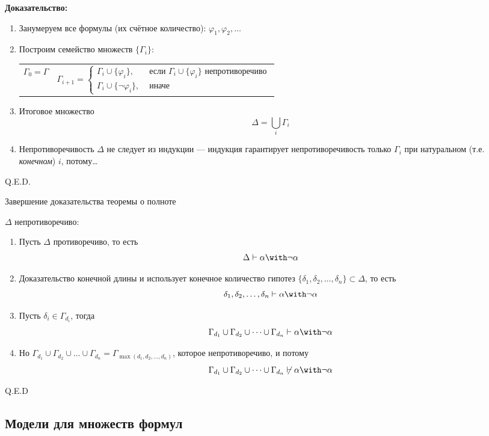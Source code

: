 \textbf{Доказательство:}
\begin{enumerate}
\item Занумеруем все формулы (их счётное количество): $\varphi_1, \varphi_2, \dots$
\item Построим семейство множеств $\{\Gamma_i\}$:

\begin{tabular}{cc}
$\Gamma_0 = \Gamma$  &
$\Gamma_{i+1} = \left\{\begin{array}{ll}\Gamma_i \cup \{\varphi_i\},& \mbox{ если } \Gamma_i \cup \{\varphi_i\} \mbox{ непротиворечиво}\\
                                               \Gamma_i \cup \{\neg\varphi_i\},& \mbox{ иначе}\end{array}\right.$
\end{tabular}
\item Итоговое множество $$\Delta = \bigcup_i \Gamma_i$$
\item Непротиворечивость $\Delta$ не следует из индукции --- индукция гарантирует непротиворечивость
      только $\Gamma_i$ при натуральном (т.е. \emph{конечном}) $i$, потому\dots
\end{enumerate}

\hfill Q.E.D.

{Завершение доказательства теоремы о полноте}



$\Delta$ непротиворечиво:
  \begin{enumerate}
    \item Пусть $\Delta$ противоречиво, то есть $$\Delta \vdash \alpha\with\neg\alpha$$
    \item Доказательство конечной длины и использует конечное количество гипотез $\{\delta_1, \delta_2, \dots, \delta_n\} \subset \Delta$,
          то есть $$\delta_1, \delta_2, \dots, \delta_n \vdash \alpha\with\neg\alpha$$
    \item Пусть $\delta_i \in \Gamma_{d_i}$, тогда $$\Gamma_{d_1}\cup \Gamma_{d_2}\cup \dots\cup \Gamma_{d_n} \vdash \alpha\with\neg\alpha$$
    \item Но $\Gamma_{d_1} \cup \Gamma_{d_2} \cup \dots \cup \Gamma_{d_n} = \Gamma_{\max(d_1,d_2,\dots,d_n)}$,
          которое непротиворечиво, и потому $$\Gamma_{d_1}\cup \Gamma_{d_2}\cup \dots\cup \Gamma_{d_n} \not\vdash \alpha\with\neg\alpha$$
  \end{enumerate}

\hfill Q.E.D

\subsection{Модели для множеств формул}

